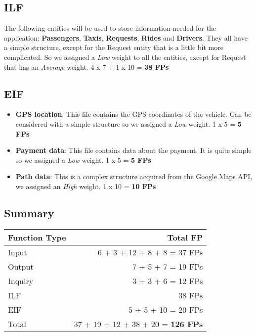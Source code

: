 \subsection{ILF}
The following entities will be used to store information needed for the application:
\textbf{Passengers}, \textbf{Taxis}, \textbf{Requests}, \textbf{Rides} and \textbf{Drivers}.
They all have a simple structure, except for the Request entity that is a little bit more complicated. So we assigned a \textit{Low} weight to all the entities, except for Request that has an \textit{Average} weight. 4 x 7 + 1 x 10 = \textbf{38 FPs}
\subsection{EIF}
    \begin{itemize}
        \item \textbf{GPS location}: This file contains the GPS coordinates of the vehicle. Can be considered with a simple structure so we assigned a \textit{Low} weight. 1 x 5 = \textbf{5 FPs}
        \item \textbf{Payment data}: This file contains data about the payment. It is quite simple so we assigned a \textit{Low} weight. 1 x 5 = \textbf{5 FPs}
        \item \textbf{Path data}: This is a complex structure acquired from the Google Maps API, we assigned an \textit{High} weight. 1 x 10 = \textbf{10 FPs}
    \end{itemize}

\subsection{Summary}
 {\renewcommand{\arraystretch}{1.5}

\begin{tabularx}{\textwidth}{X  r}
    \hline 
    \textbf{Function Type} & \textbf{Total FP}\\ 
    \hline 
    
    Input &  6 + 3 + 12 + 8 + 8 = 37 FPs\\
    \hline 
    Output & 7 + 5 + 7 = 19 FPs\\
    \hline
    Inquiry & 3 + 3 + 6 = 12 FPs\\
    \hline
    ILF & 38 FPs\\
    \hline
    EIF & 5 + 5 + 10 = 20 FPs\\
    \hline
    Total & 37 + 19 + 12 + 38 + 20 = \textbf{126 FPs}\\
    \hline
\end{tabularx}}
